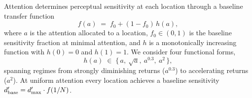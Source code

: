 Attention determines perceptual sensitivity at each location through a
baseline transfer function
\begin{equation}
  f(a) \;=\; f_0 + (1 - f_0)\,h(a),
  \label{eq:transfer}
\end{equation}
where $a$ is the attention allocated to a location, $f_0 \in (0, 1)$ is
the baseline sensitivity fraction at minimal attention, and $h$ is a
monotonically increasing function with $h(0) = 0$ and $h(1) = 1$. We
consider four functional forms,
\begin{equation}
  h(a) \;\in\; \{\, a,\ \sqrt{a},\ a^{0.3},\ a^{2} \,\},
  \label{eq:h-forms}
\end{equation}
spanning regimes from strongly diminishing returns ($a^{0.3}$) to
accelerating returns ($a^{2}$). At uniform attention every location
achieves a baseline sensitivity $d'_{\mathrm{base}} = d'_{\max}
\cdot f(1/N)$.

